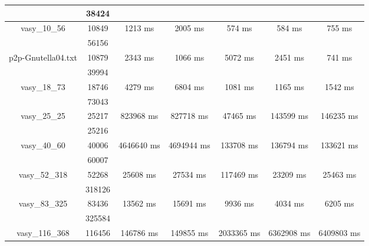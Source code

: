 \documentclass[../master/master.tex]{subfiles}
\begin{document}
\begin{center}
\begin{tabular}{ |c|c||c||c||c||c||c|| }
\cline{2-2}
 & 38424  & & & & & \\
\hline
\multirow{2}{3.8em}{vasy\_10\_56} & 10849 & \multirow{2}{3.8em}{1213 ms} & \multirow{2}{3.8em}{2005 ms} & \multirow{2}{3.8em}{574 ms} & \multirow{2}{3.8em}{584 ms} & \multirow{2}{3.8em}{755 ms} \\
\cline{2-2}
 & 56156  & & & & & \\
\hline
\multirow{2}{3.8em}{p2p-Gnutella04.txt} & 10879 & \multirow{2}{3.8em}{2343 ms} & \multirow{2}{3.8em}{1066 ms} & \multirow{2}{3.8em}{5072 ms} & \multirow{2}{3.8em}{2451 ms} & \multirow{2}{3.8em}{741 ms} \\
\cline{2-2}
 & 39994  & & & & & \\
\hline
\multirow{2}{3.8em}{vasy\_18\_73} & 18746 & \multirow{2}{3.8em}{4279 ms} & \multirow{2}{3.8em}{6804 ms} & \multirow{2}{3.8em}{1081 ms} & \multirow{2}{3.8em}{1165 ms} & \multirow{2}{3.8em}{1542 ms} \\
\cline{2-2}
 & 73043  & & & & & \\
\hline
\multirow{2}{3.8em}{vasy\_25\_25} & 25217 & \multirow{2}{3.8em}{823968 ms} & \multirow{2}{3.8em}{827718 ms} & \multirow{2}{3.8em}{47465 ms} & \multirow{2}{3.8em}{143599 ms} & \multirow{2}{3.8em}{146235 ms} \\
\cline{2-2}
 & 25216  & & & & & \\
\hline
\multirow{2}{3.8em}{vasy\_40\_60} & 40006 & \multirow{2}{3.8em}{4646640 ms} & \multirow{2}{3.8em}{4694944 ms} & \multirow{2}{3.8em}{133708 ms} & \multirow{2}{3.8em}{136794 ms} & \multirow{2}{3.8em}{133621 ms} \\
\cline{2-2}
 & 60007  & & & & & \\
\hline
\multirow{2}{3.8em}{vasy\_52\_318} & 52268 & \multirow{2}{3.8em}{25608 ms} & \multirow{2}{3.8em}{27534 ms} & \multirow{2}{3.8em}{117469 ms} & \multirow{2}{3.8em}{23209 ms} & \multirow{2}{3.8em}{25463 ms} \\
\cline{2-2}
 & 318126  & & & & & \\
\hline
\multirow{2}{3.8em}{vasy\_83\_325} & 83436 & \multirow{2}{3.8em}{13562 ms} & \multirow{2}{3.8em}{15691 ms} & \multirow{2}{3.8em}{9936 ms} & \multirow{2}{3.8em}{4034 ms} & \multirow{2}{3.8em}{6205 ms} \\
\cline{2-2}
 & 325584  & & & & & \\
\hline
\multirow{2}{3.8em}{vasy\_116\_368} & 116456 & \multirow{2}{3.8em}{146786 ms} & \multirow{2}{3.8em}{149855 ms} & \multirow{2}{3.8em}{2033365 ms} & \multirow{2}{3.8em}{6362908 ms} & \multirow{2}{3.8em}{6409803 ms} \\

\end{tabular}
\end{center}
\end{document}
